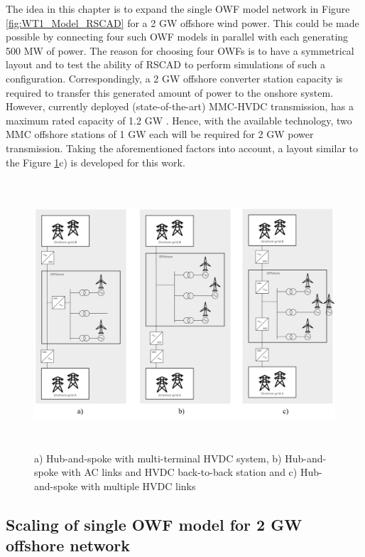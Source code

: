 The idea in this chapter is to expand the single \gls{OWF} model network in Figure \ref{fig:WT1_Model_RSCAD} for a 2 GW offshore wind power. This could be made possible by connecting four such \gls{OWF} models in parallel with each generating 500 MW of power. The reason for choosing four \gls{OWF}s is to have a symmetrical layout and to test the ability of RSCAD to perform simulations of such a configuration. Correspondingly, a 2 GW offshore converter station capacity is required to transfer this generated amount of power to the onshore system. However, currently deployed (state-of-the-art) \gls{MMC}-\gls{HVDC} transmission, has a maximum rated capacity of 1.2 GW \cite{cigre2005b4}. Hence, with the available technology, two \gls{MMC} offshore stations of 1 GW each will be required for 2 GW power transmission. Taking the aforementioned factors into account, a layout similar to the Figure \ref{fig:ABB_Hub_Spoke_3}c) is developed for this work. 

\begin{figure}[H]
\centering
    \includegraphics[height = 10cm,width = 15cm]{Diagrams/Chapter_4/ABB_Hub_Spoke_3.png}
    \caption{a) Hub-and-spoke with multi-terminal HVDC system, b) Hub-and-spoke with AC links and HVDC back-to-back station and c) Hub-and-spoke with multiple HVDC links \cite{abb_hvdc_2018}}
    \label{fig:ABB_Hub_Spoke_3}
\end{figure}

\subsection{Scaling of single \gls{OWF} model for 2 GW offshore network}\label{scaling_2GW}

